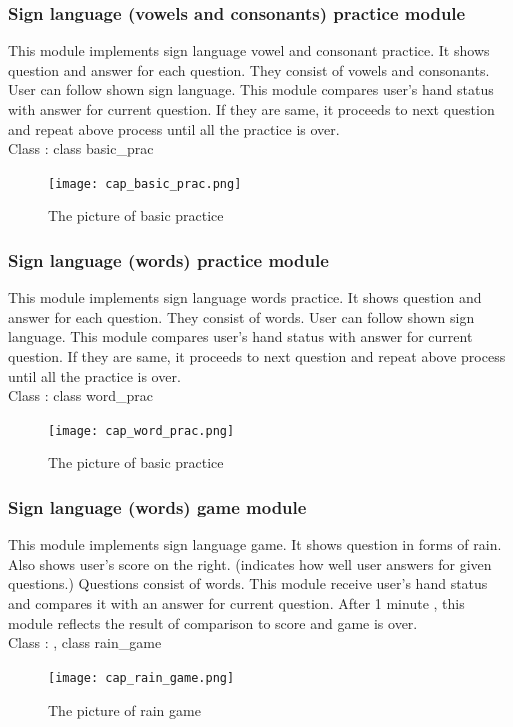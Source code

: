 \documentclass[10pt,journal,compsoc]{IEEEtran}
\begin{document}
\subsubsection{Sign language (vowels and consonants) practice module\\}

This module implements sign language vowel and consonant practice. It shows question and answer for each question. They consist of vowels and consonants. User can follow shown sign language. This module compares user’s hand status with answer for current question. If they are same, it proceeds to next question and repeat above process until all the practice is over.
\\Class : class basic\_prac
\begin{figure}[H]
\centering
\texttt{[image: cap\_basic\_prac.png]}
{\caption*{The picture of basic practice}}
\end{figure}
\subsubsection{ Sign language (words) practice module\\}
This module implements sign language words practice. It shows question and answer for each question. They consist of words. User can follow shown sign language.  This module compares user’s hand status with answer for current question. If they are same, it proceeds to next question and repeat above process until all the practice is over.
\\Class : class word\_prac
\begin{figure}[H]
\centering
\texttt{[image: cap\_word\_prac.png]}
{\caption*{The picture of basic practice}}
\end{figure}
\subsubsection{Sign language (words) game module\\}
This module implements sign language game. It shows question in forms of rain. Also shows user’s score on the right. (indicates how well user answers for given questions.) Questions consist of words. This module receive user’s hand status and compares it with an answer for current question. After 1 minute , this module reflects the result of comparison to score and game is over.
\\Class : , class rain\_game
\begin{figure}[H]
\centering
\texttt{[image: cap\_rain\_game.png]}
{\caption*{The picture of rain game}}
\end{figure}
\end{document}
